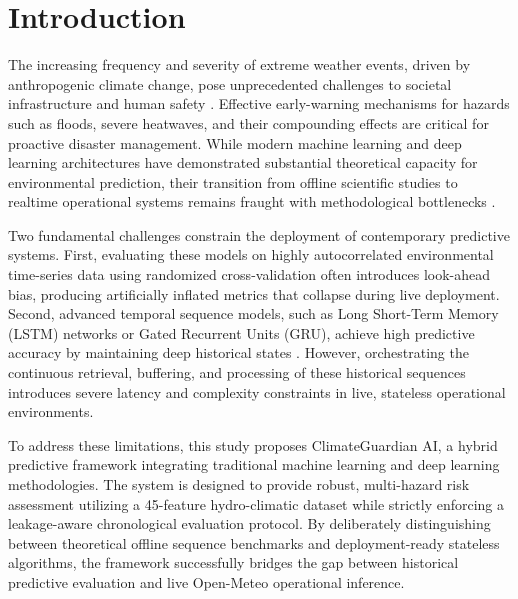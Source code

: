 \section{Introduction}
\label{sec:intro}
The increasing frequency and severity of extreme weather events, driven by anthropogenic climate change, pose unprecedented challenges to societal infrastructure and human safety \cite{IPCC2021}. Effective early-warning mechanisms for hazards such as floods, severe heatwaves, and their compounding effects are critical for proactive disaster management. While modern machine learning and deep learning architectures have demonstrated substantial theoretical capacity for environmental prediction, their transition from offline scientific studies to realtime operational systems remains fraught with methodological bottlenecks \cite{Zscheischler2020}. 

Two fundamental challenges constrain the deployment of contemporary predictive systems. First, evaluating these models on highly autocorrelated environmental time-series data using randomized cross-validation often introduces look-ahead bias, producing artificially inflated metrics that collapse during live deployment. Second, advanced temporal sequence models, such as Long Short-Term Memory (LSTM) networks or Gated Recurrent Units (GRU), achieve high predictive accuracy by maintaining deep historical states \cite{Kratzert2018}. However, orchestrating the continuous retrieval, buffering, and processing of these historical sequences introduces severe latency and complexity constraints in live, stateless operational environments.

To address these limitations, this study proposes ClimateGuardian AI, a hybrid predictive framework integrating traditional machine learning and deep learning methodologies. The system is designed to provide robust, multi-hazard risk assessment utilizing a 45-feature hydro-climatic dataset while strictly enforcing a leakage-aware chronological evaluation protocol. By deliberately distinguishing between theoretical offline sequence benchmarks and deployment-ready stateless algorithms, the framework successfully bridges the gap between historical predictive evaluation and live Open-Meteo operational inference. 
